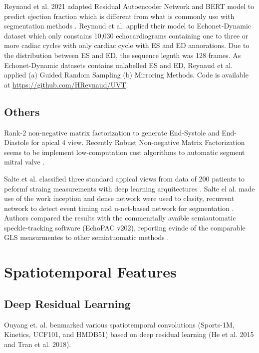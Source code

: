 Reynaud et al. 2021 adapted Residual Autoencoder Network and BERT model to predict ejection fraction which is different from what is commonly use with segmentation methods \cite{reynaud2021-MICCAI}.
Reynaud et al. applied their model to Echonet-Dynamic dataset which only constains 10,030 echocardiograms containing one to three or more cadiac cycles with only cardiac cycle with ES and ED annorations.
Due to the distribution between ES and ED, the sequence legnth was 128 frames.
As Echonet-Dynamic datasets contains unlabelled ES and ED, Reynaud et al. applied (a) Guided Random Sampling (b) Mirroring Methods.
Code is available at \url{https://github.com/HReynaud/UVT}.



\subsection{Others}
Rank-2 non-negative matrix factorization \cite{yuan2017} to generate End-Systole and End-Diastole for apical 4 view.  
Recently Robust Non-negative Matrix Factorization seems to be implement low-computation cost algorithms to automatic segment mitral valve \cite{dukler2018}.

Salte et al. classified three standard appical views from data of 200 patients to peformf straing measurements with deep learning arquitectures \cite{SALTE2021-JACC}.
Salte el al. made use of the work \cite{ostvik2021-TMI} inception and dense network were used to clasity, recurrent network to detect event timing and u-net-based network for segmentation \cite{SALTE2021-JACC}.
Authors compared the results with the commenrially avaible semiautomatic speckle-tracking software (EchoPAC v202), reporting evinde of the comparable GLS measurmentes to other semiatuomatic methods \cite{SALTE2021-JACC}.




\section{Spatiotemporal Features}


\subsection{Deep Residual Learning}
Ouyang et. al. benmarked various spatiotemporal convolutions (Sports-1M, Kinetics, UCF101, and HMDB51) \cite{ouyang-NeuripsML4H2019}  based on deep residual learning (He et al. 2015 and Tran et al. 2018).

